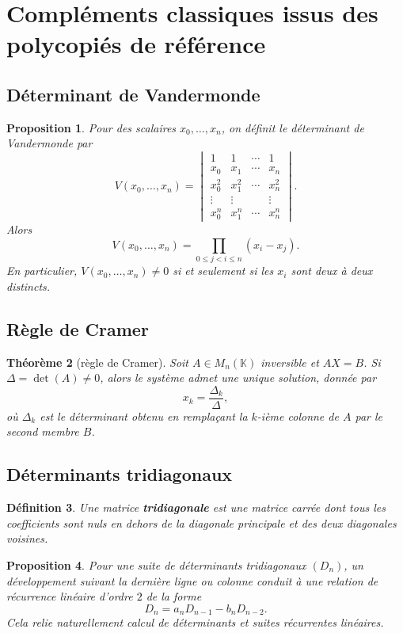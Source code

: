 \documentclass[11pt,a4paper]{article}
\newtheorem{definition}{Définition}[section]
\newtheorem{theoreme}[definition]{Théorème}
\newtheorem{proposition}[definition]{Proposition}
\theoremstyle{remark}
\newcommand{\K}{\mathbb{K}}
\begin{document}
\section{Compléments classiques issus des polycopiés de référence}

\subsection{Déterminant de Vandermonde}

\begin{proposition}
Pour des scalaires \(x_0,\dots,x_n\), on définit le déterminant de Vandermonde par
\[
V(x_0,\dots,x_n)=
\begin{vmatrix}
1&1&\cdots&1\\
x_0&x_1&\cdots&x_n\\
x_0^2&x_1^2&\cdots&x_n^2\\
\vdots&\vdots&&\vdots\\
x_0^n&x_1^n&\cdots&x_n^n
\end{vmatrix}.
\]
Alors
\[
V(x_0,\dots,x_n)=\prod_{0\le j<i\le n}(x_i-x_j).
\]
En particulier, \(V(x_0,\dots,x_n)\neq 0\) si et seulement si les \(x_i\) sont deux à deux distincts.
\end{proposition}

\subsection{Règle de Cramer}

\begin{theoreme}[règle de Cramer]
Soit \(A\in M_n(\K)\) inversible et \(AX=B\).
Si \(\Delta=\det(A)\neq 0\), alors le système admet une unique solution, donnée par
\[
x_k=\frac{\Delta_k}{\Delta},
\]
où \(\Delta_k\) est le déterminant obtenu en remplaçant la \(k\)-ième colonne de \(A\) par le second membre \(B\).
\end{theoreme}

\subsection{Déterminants tridiagonaux}

\begin{definition}
Une matrice \textbf{tridiagonale} est une matrice carrée dont tous les coefficients sont nuls en dehors de la diagonale principale et des deux diagonales voisines.
\end{definition}

\begin{proposition}
Pour une suite de déterminants tridiagonaux \((D_n)\), un développement suivant la dernière ligne ou colonne conduit à une relation de récurrence linéaire d’ordre \(2\) de la forme
\[
D_n=a_nD_{n-1}-b_nD_{n-2}.
\]
Cela relie naturellement calcul de déterminants et suites récurrentes linéaires.
\end{proposition}
\end{document}
